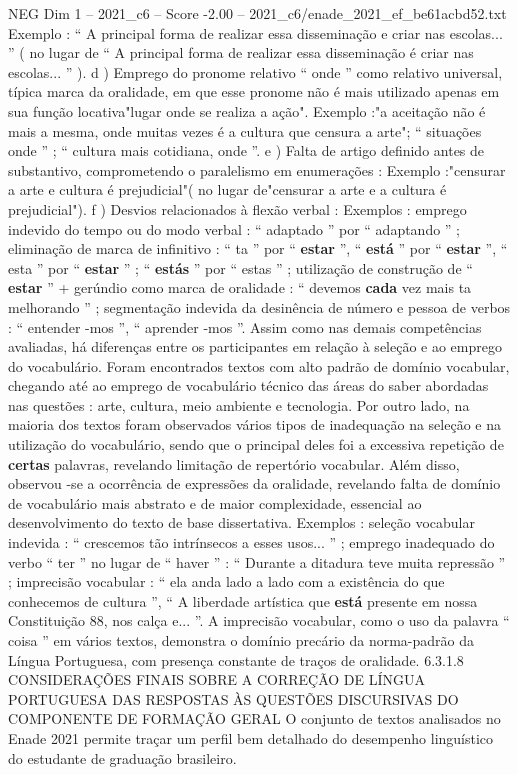 \begin{textsample}{NEG Dim 1 – 2021\_c6 – Score -2.00 – 2021\_c6/enade\_2021\_ef\_be61acbd52.txt}
Exemplo : “ A principal forma de realizar essa disseminação e criar nas escolas... ” ( no lugar de “ A principal forma de realizar essa disseminação é criar nas escolas... ” ). d ) Emprego do pronome relativo “ onde ” como relativo universal, típica marca da oralidade, em que esse pronome não é mais utilizado apenas em sua função locativa"lugar onde se realiza a ação".
Exemplo :"a aceitação não é mais a mesma, onde muitas vezes é a cultura que censura a arte"; “ situações onde ” ; “ cultura mais cotidiana, onde ”. e ) Falta de artigo definido antes de substantivo, comprometendo o paralelismo em enumerações : Exemplo :"censurar a arte e cultura é prejudicial"( no lugar de"censurar a arte e a cultura é prejudicial"). f ) Desvios relacionados à flexão verbal : Exemplos : emprego indevido do tempo ou do modo verbal : “ adaptado ” por “ adaptando ” ; eliminação de marca de infinitivo : “ ta ” por “ \textbf{estar} ”, “ \textbf{está} ” por “ \textbf{estar} ”, “ esta ” por “ \textbf{estar} ” ; “ \textbf{estás} ” por “ estas ” ; utilização de construção de “ \textbf{estar} ” + gerúndio como marca de oralidade : “ devemos \textbf{cada} vez mais ta melhorando ” ; segmentação indevida da desinência de número e pessoa de verbos : “ entender -mos ”, “ aprender -mos ”.
Assim como nas demais competências avaliadas, há diferenças entre os participantes em relação à seleção e ao emprego do vocabulário.
Foram encontrados textos com alto padrão de domínio vocabular, chegando até ao emprego de vocabulário técnico das áreas do saber abordadas nas questões : arte, cultura, meio ambiente e tecnologia.
Por outro lado, na maioria dos textos foram observados vários tipos de inadequação na seleção e na utilização do vocabulário, sendo que o principal deles foi a excessiva repetição de \textbf{certas} palavras, revelando limitação de repertório vocabular.
Além disso, observou -se a ocorrência de expressões da oralidade, revelando falta de domínio de vocabulário mais abstrato e de maior complexidade, essencial ao desenvolvimento do texto de base dissertativa.
Exemplos : seleção vocabular indevida : “ crescemos tão intrínsecos a esses usos... ” ; emprego inadequado do verbo “ ter ” no lugar de “ haver ” : “ Durante a ditadura teve muita repressão ” ; imprecisão vocabular : “ ela anda lado a lado com a existência do que conhecemos de cultura ”, “ A liberdade artística que \textbf{está} presente em nossa Constituição 88, nos calça e... ”.
A imprecisão vocabular, como o uso da palavra “ coisa ” em vários textos, demonstra o domínio precário da norma-padrão da Língua Portuguesa, com presença constante de traços de oralidade. 6.3.1.8 CONSIDERAÇÕES FINAIS SOBRE A CORREÇÃO DE LÍNGUA PORTUGUESA DAS RESPOSTAS ÀS QUESTÕES DISCURSIVAS DO COMPONENTE DE FORMAÇÃO GERAL O conjunto de textos analisados no Enade 2021 permite traçar um perfil bem detalhado do desempenho linguístico do estudante de graduação brasileiro.

\end{textsample}
